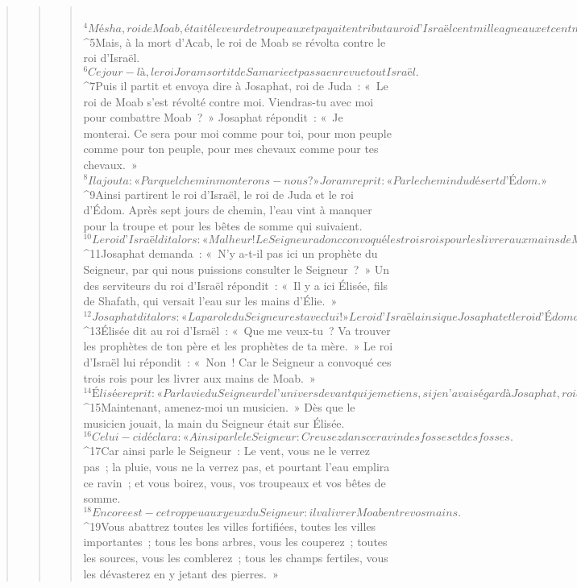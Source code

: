 \begin{verse}
\begin{verse}
\begin{verse}
         
${}^{4}Mésha, roi de Moab, était éleveur de troupeaux et payait en tribut au roi d’Israël cent mille agneaux et cent mille béliers avec leur laine. 
${}^{5}Mais, à la mort d’Acab, le roi de Moab se révolta contre le roi d’Israël. 
${}^{6}Ce jour-là, le roi Joram sortit de Samarie et passa en revue tout Israël. 
${}^{7}Puis il partit et envoya dire à Josaphat, roi de Juda : « Le roi de Moab s’est révolté contre moi. Viendras-tu avec moi pour combattre Moab ? » Josaphat répondit : « Je monterai. Ce sera pour moi comme pour toi, pour mon peuple comme pour ton peuple, pour mes chevaux comme pour tes chevaux. » 
${}^{8}Il ajouta : « Par quel chemin monterons-nous ? » Joram reprit : « Par le chemin du désert d’Édom. »
${}^{9}Ainsi partirent le roi d’Israël, le roi de Juda et le roi d’Édom. Après sept jours de chemin, l’eau vint à manquer pour la troupe et pour les bêtes de somme qui suivaient. 
${}^{10}Le roi d’Israël dit alors : « Malheur ! Le Seigneur a donc convoqué les trois rois pour les livrer aux mains de Moab. » 
${}^{11}Josaphat demanda : « N’y a-t-il pas ici un prophète du Seigneur, par qui nous puissions consulter le Seigneur ? » Un des serviteurs du roi d’Israël répondit : « Il y a ici Élisée, fils de Shafath, qui versait l’eau sur les mains d’Élie. » 
${}^{12}Josaphat dit alors : « La parole du Seigneur est avec lui ! » Le roi d’Israël ainsi que Josaphat et le roi d’Édom descendirent vers lui. 
${}^{13}Élisée dit au roi d’Israël : « Que me veux-tu ? Va trouver les prophètes de ton père et les prophètes de ta mère. » Le roi d’Israël lui répondit : « Non ! Car le Seigneur a convoqué ces trois rois pour les livrer aux mains de Moab. » 
${}^{14}Élisée reprit : « Par la vie du Seigneur de l’univers devant qui je me tiens, si je n’avais égard à Josaphat, roi de Juda, je ne te prêterais aucune attention, je ne te regarderais pas ! 
${}^{15}Maintenant, amenez-moi un musicien. » Dès que le musicien jouait, la main du Seigneur était sur Élisée. 
${}^{16}Celui-ci déclara : « Ainsi parle le Seigneur : Creusez dans ce ravin des fosses et des fosses. 
${}^{17}Car ainsi parle le Seigneur : Le vent, vous ne le verrez pas ; la pluie, vous ne la verrez pas, et pourtant l’eau emplira ce ravin ; et vous boirez, vous, vos troupeaux et vos bêtes de somme. 
${}^{18}Encore est-ce trop peu aux yeux du Seigneur : il va livrer Moab entre vos mains. 
${}^{19}Vous abattrez toutes les villes fortifiées, toutes les villes importantes ; tous les bons arbres, vous les couperez ; toutes les sources, vous les comblerez ; tous les champs fertiles, vous les dévasterez en y jetant des pierres. » 

\end{verse}
\end{verse}
\end{verse}
